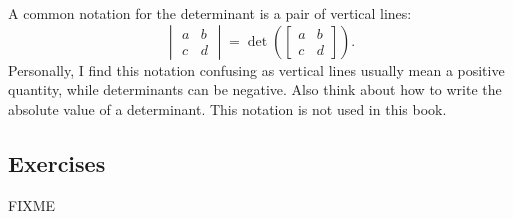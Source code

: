 %

\medskip


A common notation for the determinant is a pair of vertical
lines:
\begin{equation*}
\begin{vmatrix}
a & b \\
c & d
\end{vmatrix}
=
\det \left(
\begin{bmatrix}
a & b \\
c & d
\end{bmatrix}
\right) .
\end{equation*}
Personally, I find this notation confusing as vertical lines usually
mean a positive quantity, while determinants can be negative.  Also
think about how to write the absolute value of a determinant.
This notation is not used in this book.

\subsection{Exercises}

FIXME
